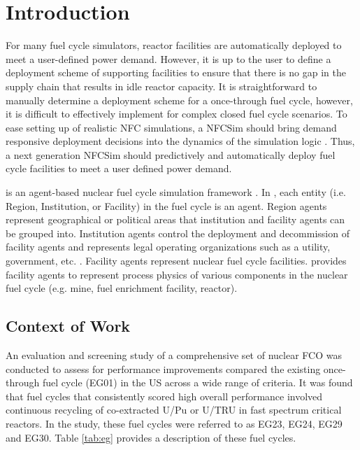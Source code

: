 \section{Introduction}
For many fuel cycle simulators, reactor facilities are automatically 
deployed to meet a user-defined power demand. 
However, it is up to the user to define a deployment scheme of 
supporting facilities to ensure that there is no gap in the supply 
chain that results in idle reactor capacity. 
It is straightforward to manually determine a deployment scheme 
for a once-through fuel cycle, however, it is difficult to effectively 
implement for complex closed fuel cycle scenarios.  
To ease setting up of realistic \gls{NFC} simulations, a \gls{NFCSim}
should bring demand responsive deployment decisions into 
the dynamics of the simulation logic \cite{huff_current_2017}. 
Thus, a next generation \gls{NFCSim} should predictively and 
automatically deploy fuel cycle facilities to meet a user defined 
power demand. 

\Cyclus is an agent-based nuclear fuel cycle simulation framework 
\cite{huff_fundamental_2016}. 
In \Cyclus, each entity (i.e. Region, Institution, or Facility) in the 
fuel cycle is an agent. 
Region agents represent geographical or political areas that institution
and facility agents can be grouped into. 
Institution agents control the 
deployment and decommission of facility agents 
and represents legal operating organizations such as a 
utility, government, etc. \cite{huff_fundamental_2016}. 
Facility agents represent nuclear fuel cycle facilities. 
\Cycamore \cite{carlsen_cycamore_2014}
provides facility agents to represent process physics of various 
components in the nuclear fuel cycle (e.g. mine, fuel enrichment 
facility, reactor). 

\subsection{Context of Work}
An evaluation and screening study of a comprehensive set of nuclear 
\gls{FCO} \cite{wigeland_nuclear_2014} was conducted to assess 
for performance improvements compared the existing once-through 
fuel cycle (EG01) in the \gls{US} across a wide range of criteria. 
It was found that fuel cycles that consistently scored high 
overall performance involved continuous recycling
of co-extracted U/Pu or U/TRU in fast spectrum critical reactors. 
In the study, these fuel cycles were referred to as EG23, EG24, 
EG29 and EG30. 
Table \ref{tab:eg} provides a description of these fuel cycles. 

